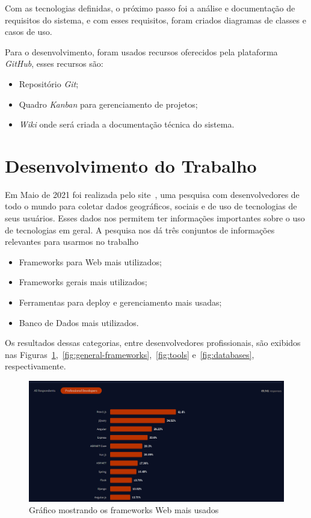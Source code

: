 \documentclass[12pt]{article}
\begin{document}
Com as tecnologias definidas, o próximo passo foi a análise e documentação de requisitos do sistema,
e com esses requisitos, foram criados diagramas de classes e casos de uso.

Para o desenvolvimento, foram usados recursos oferecidos pela plataforma \textit{GitHub}, esses recursos são:

\begin{itemize}
  \item Repositório \textit{Git};
  \item Quadro \textit{Kanban} para gerenciamento de projetos;
  \item \textit{Wiki} onde será criada a documentação técnica do sistema.
\end{itemize}

\section{Desenvolvimento do Trabalho}\label{Desenvolvimento}

Em Maio de 2021 foi realizada pelo site~\cite{stack11}, uma pesquisa com desenvolvedores de todo o mundo para
coletar dados geográficos, sociais e de uso de tecnologias de seus usuários. Esses dados nos permitem ter
informações importantes sobre o uso de tecnologias em geral. A pesquisa nos dá três conjuntos
de informações relevantes para usarmos no trabalho

\begin{itemize}
  \item Frameworks para Web mais utilizados;
  \item Frameworks gerais mais utilizados;
  \item Ferramentas para deploy e gerenciamento mais usadas;
  \item Banco de Dados mais utilizados.
\end{itemize}

Os resultados dessas categorias, entre desenvolvedores profissionais, são exibidos nas
Figuras~\ref{fig:web-frameworks},~\ref{fig:general-frameworks},~\ref{fig:tools} e~\ref{fig:databases}, respectivamente.

\begin{figure}[H]
  \centering
  \includegraphics[width=1\textwidth]{stackoverflow/web_frameworks_usage.png}
  \caption{Gráfico mostrando os frameworks Web mais usados}\label{fig:web-frameworks}
\end{figure}
\end{document}
